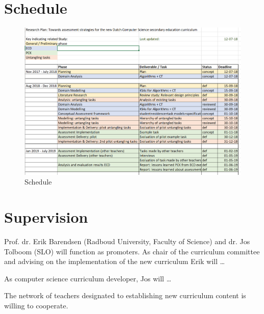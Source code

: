 
\section{Schedule}\label{sec:Schedule}

\begin{figure}\label{fig:ECD}
\includegraphics[scale=0.8]{figures/schedule.png}
\caption{Schedule}
\end{figure}


\section{Supervision}\label{sec:Supervision}

Prof. dr. Erik Barendsen (Radboud University, Faculty of Science) and dr. Jos Tolboom (SLO) will function as promoters.
As chair of the curriculum committee and advising on the implementation of the new curriculum Erik will \dots

As computer science curriculum developer, Jos will \ldots

The network of teachers designated to establishing new curriculum content is willing to cooperate.
